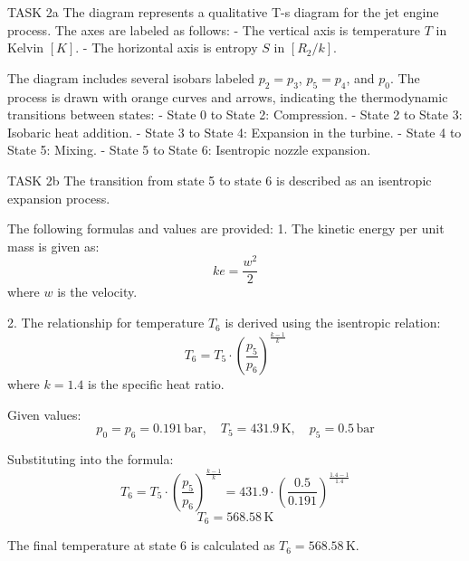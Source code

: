 TASK 2a  
The diagram represents a qualitative T-s diagram for the jet engine process. The axes are labeled as follows:  
- The vertical axis is temperature \( T \) in Kelvin \([K]\).  
- The horizontal axis is entropy \( S \) in \([R_2/k]\).  

The diagram includes several isobars labeled \( p_2 = p_3 \), \( p_5 = p_4 \), and \( p_0 \). The process is drawn with orange curves and arrows, indicating the thermodynamic transitions between states:  
- State 0 to State 2: Compression.  
- State 2 to State 3: Isobaric heat addition.  
- State 3 to State 4: Expansion in the turbine.  
- State 4 to State 5: Mixing.  
- State 5 to State 6: Isentropic nozzle expansion.  

TASK 2b  
The transition from state 5 to state 6 is described as an isentropic expansion process.  

The following formulas and values are provided:  
1. The kinetic energy per unit mass is given as:  
\[
ke = \frac{w^2}{2}
\]  
where \( w \) is the velocity.  

2. The relationship for temperature \( T_6 \) is derived using the isentropic relation:  
\[
T_6 = T_5 \cdot \left( \frac{p_5}{p_6} \right)^{\frac{k-1}{k}}
\]  
where \( k = 1.4 \) is the specific heat ratio.  

Given values:  
\[
p_0 = p_6 = 0.191 \, \text{bar}, \quad T_5 = 431.9 \, \text{K}, \quad p_5 = 0.5 \, \text{bar}
\]  

Substituting into the formula:  
\[
T_6 = T_5 \cdot \left( \frac{p_5}{p_6} \right)^{\frac{k-1}{k}} = 431.9 \cdot \left( \frac{0.5}{0.191} \right)^{\frac{1.4-1}{1.4}}
\]  
\[
T_6 = 568.58 \, \text{K}
\]  

The final temperature at state 6 is calculated as \( T_6 = 568.58 \, \text{K} \).